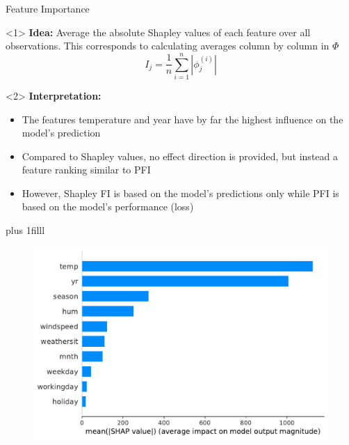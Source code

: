 \documentclass[11pt,compress,t,notes=noshow, aspectratio=169, xcolor=table]{beamer}
\newcommand{\btVFill}{\vskip0pt plus 1filll}
\begin{document}
 \begin{frame}{Feature Importance}

\begin{onlyenv}<1>
\textbf{Idea:} Average the absolute Shapley values of each feature over all observations. This corresponds to calculating averages column by column in $\Phi$
$$
I_{j}=\frac{1}{n} \sum_{i=1}^{n}\left|\phi_{j}^{(i)}\right|
$$
\end{onlyenv}

\begin{onlyenv}<2>
\textbf{Interpretation:}
\begin{itemize}
    \item The features temperature and year have by far the highest influence on the model's prediction
    \item Compared to Shapley values, no effect direction is provided, but instead a feature ranking similar to PFI
    \item However, Shapley FI is based on the model's predictions only while PFI is based on the model's performance (loss)
\end{itemize}
 
\end{onlyenv}


\btVFill

\begin{figure}
    \centering
    \includegraphics[width=0.5\columnwidth]{figure_man/global_shap_fi.pdf}
\end{figure}

\end{frame}
 
\end{document}

